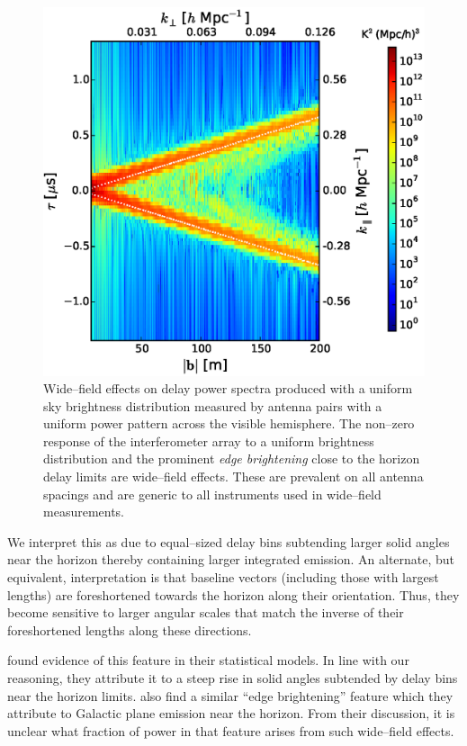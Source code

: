 \documentclass[preprint2,iop,numberedappendix,twocolappendix,appendixfloats]{emulateapj}
\begin{document}
\begin{figure}[htb]
\centering
\includegraphics[width=\linewidth]{figure2.eps}
\caption{Wide--field effects on delay power spectra produced with a uniform sky brightness distribution measured by antenna pairs with a uniform power pattern across the visible hemisphere. The non--zero response of the interferometer array to a uniform brightness distribution and the prominent {\it edge brightening} close to the horizon delay limits are wide--field effects. These are prevalent on all antenna spacings and are generic to all instruments used in wide--field measurements. \label{fig:usm}}
\end{figure}

We interpret this as due to equal--sized delay bins subtending larger solid angles near the horizon thereby containing larger integrated emission. An alternate, but equivalent, interpretation is that baseline vectors (including those with largest lengths) are foreshortened towards the horizon along their orientation. Thus, they become sensitive to larger angular scales that match the inverse of their foreshortened lengths along these directions.

\citet{thy13} found evidence of this feature in their statistical models. In line with our reasoning, they attribute it to a steep rise in solid angles subtended by delay bins near the horizon limits. \citet{pob13} also find a similar ``edge brightening'' feature which they attribute to Galactic plane emission near the horizon. From their discussion, it is unclear what fraction of power in that feature arises from such wide--field effects.
\end{document}
